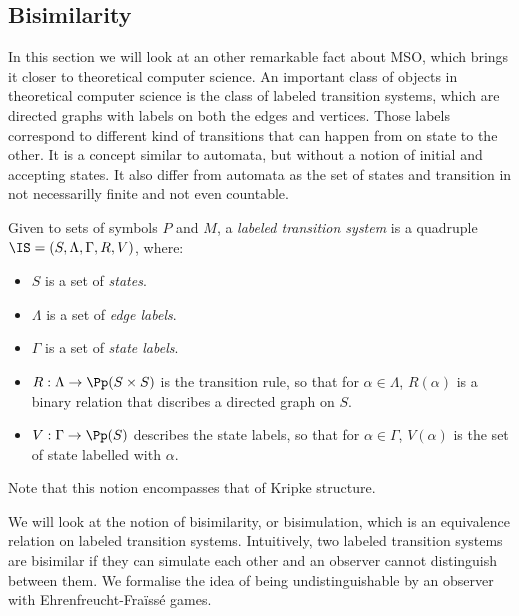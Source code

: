 \subsection{Bisimilarity}

In this section we will look at an other remarkable fact
about MSO, which brings it closer to theoretical computer science.
An important class of objects in theoretical computer science
is the class of labeled transition systems,
which are directed graphs with labels on both the edges and vertices.
Those labels correspond to different kind of transitions
that can happen from on state to the other. It is a concept similar
to automata, but without a notion of initial and accepting states.
It also differ from automata as the set of states and transition in not necessarilly finite
and not even countable.

\begin{definition}
    Given to sets of symbols $P$ and $M$,
    a \emph{labeled transition system}
    is a quadruple $\IS = (S, \Lambda, \Gamma, R, V)$, where:
    \begin{itemize}
        \item $S$ is a set of \emph{states}.
        \item $\Lambda$ is a set of \emph{edge labels}.
        \item $\Gamma$ is a set of \emph{state labels}.
        \item $R: \Lambda \to \Pp(S \times S)$ is the transition rule,
            so that for $\alpha \in \Lambda$, $R(\alpha)$ is a binary relation
            that discribes a directed graph on $S$.
        \item $V: \Gamma \to \Pp(S)$ describes the state labels,
            so that for $\alpha \in \Gamma$,
            $V(\alpha)$ is the set of state labelled with $\alpha$.
    \end{itemize}

    Note that this notion encompasses that of Kripke structure.
\end{definition}

We will look at the notion of bisimilarity, or bisimulation, which is
an equivalence relation on labeled transition systems.
Intuitively, two labeled transition systems are bisimilar if
they can simulate each other and an observer cannot distinguish
between them.
We formalise the idea of being undistinguishable
by an observer with Ehrenfreucht-Fraïssé games.

